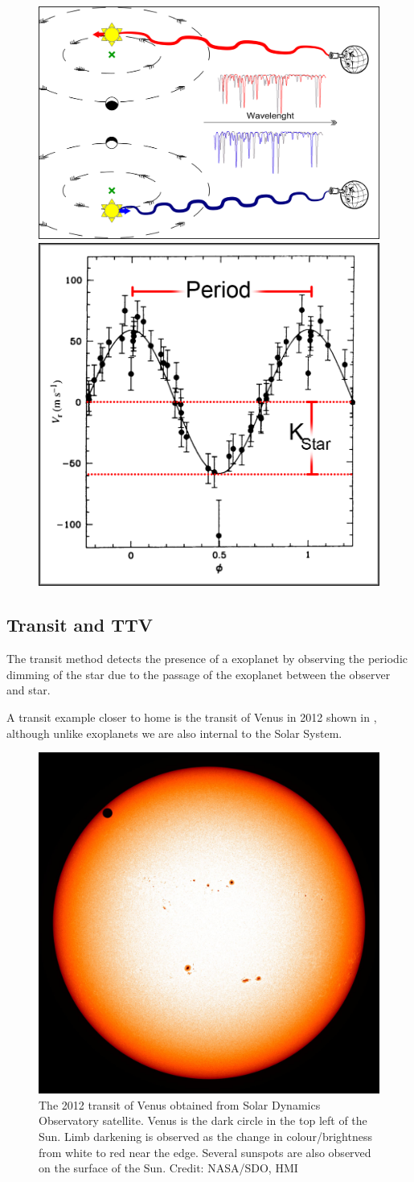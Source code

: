 \begin{figure}
    \centering
        \includegraphics[width=0.5\linewidth]{./figures/introduction/RV_Diagram}
    \includegraphics[width=0.5\linewidth]{./figures/introduction/PhaseFolded_51Pegb_Mayor_et_al_1995}
    \caption{}
    \label{fig:rvdiagram-mayor}
\end{figure}


\subsection{Transit and TTV}
The transit method detects the presence of a exoplanet by observing the periodic dimming of the star due to the passage of the exoplanet between the observer and star.  

A transit example closer to home is the transit of Venus in 2012 shown in  , although unlike exoplanets we are also internal to the Solar System.
\begin{figure}
    \centering
    \includegraphics[width=0.3\linewidth]{./figures/introduction/SDO_2012_Venus_Transit.jpg}
    \caption{The 2012 transit of Venus obtained from Solar Dynamics Observatory satellite. Venus is the dark circle in the top left of the Sun. Limb darkening is observed as the change in colour/brightness from white to red near the edge. Several sunspots are also observed on the surface of the Sun. Credit: NASA/SDO, HMI}
    \label{fig:transit_venus}
\end{figure}

